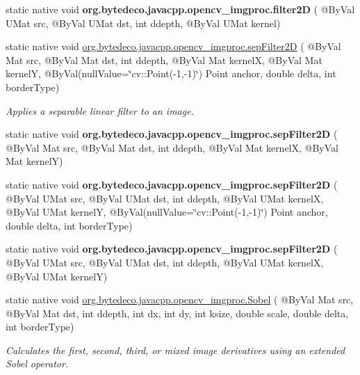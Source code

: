 \begin{DoxyCompactItemize}
static native void {\bfseries org.\+bytedeco.\+javacpp.\+opencv\+\_\+imgproc.\+filter2D} ( @By\+Val U\+Mat src, @By\+Val U\+Mat dst, int ddepth, @By\+Val U\+Mat kernel)
\item 
static native void \hyperlink{group__imgproc__filter_ga716654f3d25206913e265bf388fd83d0}{org.\+bytedeco.\+javacpp.\+opencv\+\_\+imgproc.\+sep\+Filter2D} ( @By\+Val Mat src, @By\+Val Mat dst, int ddepth, @By\+Val Mat kernelX, @By\+Val Mat kernelY, @By\+Val(null\+Value=\char`\"{}cv\+::\+Point(-\/1,-\/1)\char`\"{}) Point anchor, double delta, int border\+Type)
\begin{DoxyCompactList}\small\item\em Applies a separable linear filter to an image. \end{DoxyCompactList}\item 
\mbox{\label{group__imgproc__filter_gaf2d8d962ce153aab98ee6c5d0637c731}} 
static native void {\bfseries org.\+bytedeco.\+javacpp.\+opencv\+\_\+imgproc.\+sep\+Filter2D} ( @By\+Val Mat src, @By\+Val Mat dst, int ddepth, @By\+Val Mat kernelX, @By\+Val Mat kernelY)
\item 
\mbox{\label{group__imgproc__filter_ga2035b246fa133c96e4469b8566b7674b}} 
static native void {\bfseries org.\+bytedeco.\+javacpp.\+opencv\+\_\+imgproc.\+sep\+Filter2D} ( @By\+Val U\+Mat src, @By\+Val U\+Mat dst, int ddepth, @By\+Val U\+Mat kernelX, @By\+Val U\+Mat kernelY, @By\+Val(null\+Value=\char`\"{}cv\+::\+Point(-\/1,-\/1)\char`\"{}) Point anchor, double delta, int border\+Type)
\item 
\mbox{\label{group__imgproc__filter_ga0581b57344a84bf92ed8304a31c0d5ae}} 
static native void {\bfseries org.\+bytedeco.\+javacpp.\+opencv\+\_\+imgproc.\+sep\+Filter2D} ( @By\+Val U\+Mat src, @By\+Val U\+Mat dst, int ddepth, @By\+Val U\+Mat kernelX, @By\+Val U\+Mat kernelY)
\item 
static native void \hyperlink{group__imgproc__filter_ga99eaf057a0aad8f1ba5bc04ca0defe15}{org.\+bytedeco.\+javacpp.\+opencv\+\_\+imgproc.\+Sobel} ( @By\+Val Mat src, @By\+Val Mat dst, int ddepth, int dx, int dy, int ksize, double scale, double delta, int border\+Type)
\begin{DoxyCompactList}\small\item\em Calculates the first, second, third, or mixed image derivatives using an extended Sobel operator. \end{DoxyCompactList}\item 

\end{DoxyCompactItemize}
